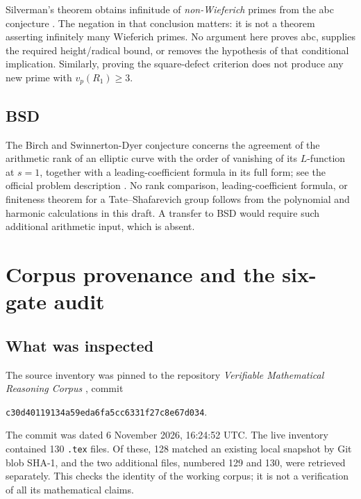\documentclass[11pt,a4paper]{article}
\theoremstyle{definition}
\theoremstyle{remark}
\begin{document}
Silverman's theorem obtains infinitude of \emph{non-Wieferich}
primes from the abc conjecture \cite{Silverman1988}.  The negation
in that conclusion matters: it is not a theorem asserting infinitely
many Wieferich primes.  No argument here proves abc, supplies the
required height/radical bound, or removes the hypothesis of that
conditional implication.  Similarly, proving the square-defect
criterion does not produce any new prime with $v_p(R_1)\ge3$.

\subsection{BSD}

The Birch and Swinnerton-Dyer conjecture concerns the agreement of
the arithmetic rank of an elliptic curve with the order of vanishing
of its $L$-function at $s=1$, together with a leading-coefficient
formula in its full form; see the official problem description
\cite{WilesBSD}.  No rank comparison, leading-coefficient formula,
or finiteness theorem for a Tate--Shafarevich group follows from the
polynomial and harmonic calculations in this draft.  A transfer to
BSD would require such additional arithmetic input, which is absent.

\section{Corpus provenance and the six-gate audit}
\label{sec:audit}

\subsection{What was inspected}

The source inventory was pinned to the repository
\emph{Verifiable Mathematical Reasoning Corpus} \cite{VMRC}, commit
\begin{center}
\small\texttt{c30d40119134a59eda6fa5cc6331f27c8e67d034}.
\end{center}
The commit was dated 6 November 2026, 16:24:52 UTC.  The live
inventory contained 130 \texttt{.tex} files.  Of these, 128 matched
an existing local snapshot by Git blob SHA-1, and the two additional
files, numbered 129 and 130, were retrieved separately.  This checks
the identity of the working corpus; it is not a verification of all
its mathematical claims.
\end{document}
